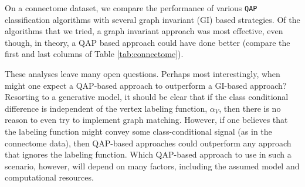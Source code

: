 \documentclass{article} %
\newcommand{\qap}{\texttt{QAP} }
\begin{document}
On a connectome dataset, we compare the performance of various \qap classification algorithms with several graph invariant (GI) based strategies.  Of the algorithms that we tried, a graph invariant approach was most effective, even though, in theory, a QAP based approach could have done better (compare the first and last columns of Table \ref{tab:connectome}).  

These analyses leave many open questions.  Perhaps most interestingly, when might one expect a QAP-based approach to outperform a GI-based approach?  Resorting to a generative model, it should be clear that if the class conditional difference is independent of the vertex labeling function, $\alpha_V$, then there is no reason to even try to implement graph matching.  However, if one believes that the labeling function might convey some class-conditional signal (as in the connectome data), then QAP-based approaches could outperform any approach that ignores the labeling function.  Which QAP-based approach to use in such a scenario, however, will depend on many factors, including the assumed model and computational resources.



% 



%

%


% 
% 
% 
% 
% 
\end{document}
